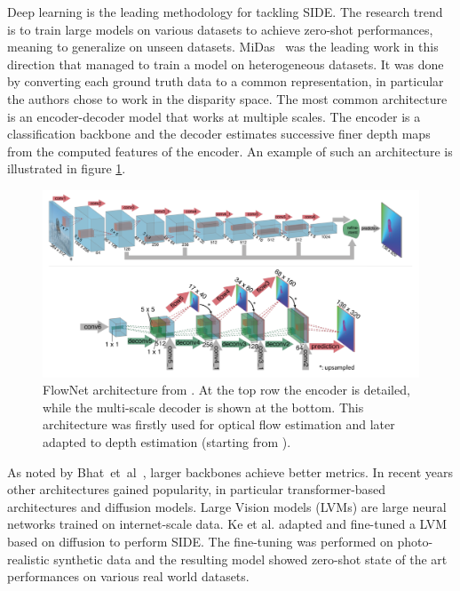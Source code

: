 Deep learning is the leading methodology for tackling SIDE.
The research trend is to train large models on various datasets to achieve zero-shot performances, meaning to generalize on unseen datasets.
MiDas~\cite{MiDas} was the leading work in this direction that managed to train a model on heterogeneous datasets.
It was done by converting each ground truth data to a common representation, in particular the authors chose to work in the disparity space.
The most common architecture is an encoder-decoder model that works at multiple scales.
The encoder is a classification backbone and the decoder estimates successive finer depth maps from the computed features of the encoder.
An example of such an architecture is illustrated in figure \ref{fig:flow_net}.
\begin{figure}
    \includegraphics[scale=0.5]{figs/flow_net}
    \caption{
        FlowNet architecture from \cite{FlowNet}.
        At the top row the encoder is detailed, while the multi-scale decoder is shown at the bottom.
        This architecture was firstly used for optical flow estimation and later adapted to depth estimation (starting from \cite{DispNet}).
        \label{fig:flow_net}    
    }
\end{figure}
As noted by Bhat~et~al~\cite{ZoeDepth}, larger backbones achieve better metrics.
In recent years other architectures gained popularity, in particular transformer-based architectures \cite{denseViT, PatchFusion} and diffusion models.
Large Vision models (LVMs) are large neural networks trained on internet-scale data.
Ke et al. adapted and fine-tuned a LVM based on diffusion to perform SIDE.
The fine-tuning was performed on photo-realistic synthetic data and the resulting model showed zero-shot state of the art performances on various real world datasets.

